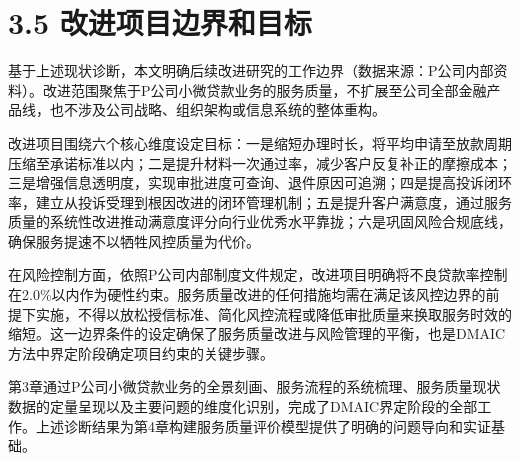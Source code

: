 \section{3.5 改进项目边界和目标}

基于上述现状诊断，本文明确后续改进研究的工作边界（数据来源：P公司内部资料）。改进范围聚焦于P公司小微贷款业务的服务质量，不扩展至公司全部金融产品线，也不涉及公司战略、组织架构或信息系统的整体重构\cite{ref10}。\par

改进项目围绕六个核心维度设定目标：一是缩短办理时长，将平均申请至放款周期压缩至承诺标准以内；二是提升材料一次通过率，减少客户反复补正的摩擦成本；三是增强信息透明度，实现审批进度可查询、退件原因可追溯；四是提高投诉闭环率，建立从投诉受理到根因改进的闭环管理机制；五是提升客户满意度，通过服务质量的系统性改进推动满意度评分向行业优秀水平靠拢；六是巩固风险合规底线，确保服务提速不以牺牲风控质量为代价\cite{ref24}。\par

在风险控制方面，依照P公司内部制度文件规定，改进项目明确将不良贷款率控制在2.0\%以内作为硬性约束。服务质量改进的任何措施均需在满足该风控边界的前提下实施，不得以放松授信标准、简化风控流程或降低审批质量来换取服务时效的缩短\cite{ref24}。这一边界条件的设定确保了服务质量改进与风险管理的平衡，也是DMAIC方法中界定阶段确定项目约束的关键步骤。\par

第3章通过P公司小微贷款业务的全景刻画、服务流程的系统梳理、服务质量现状数据的定量呈现以及主要问题的维度化识别，完成了DMAIC界定阶段的全部工作。上述诊断结果为第4章构建服务质量评价模型提供了明确的问题导向和实证基础。\par
